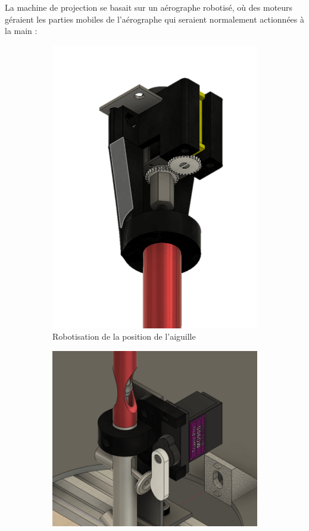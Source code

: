 \newpage
La machine de projection se basait sur un aérographe robotisé, où des moteurs géraient les parties mobiles
de l'aérographe qui seraient normalement actionnées à la main :
\begin{figure}[H]
  \centering
  \begin{subfigure}{.35\textwidth}
    \centering
    \includegraphics[width=1\linewidth]{assets/figures/situation_initiale/robotisation_aiguille.png}
    \caption{Robotisation de la position de l'aiguille}
    \label{fig:robot_aiguille}
  \end{subfigure}%
  \begin{subfigure}{.65\textwidth}
    \centering
    \includegraphics[width=.75\linewidth]{assets/figures/situation_initiale/Robotisation_projection.png}

\end{subfigure}
\end{figure}
